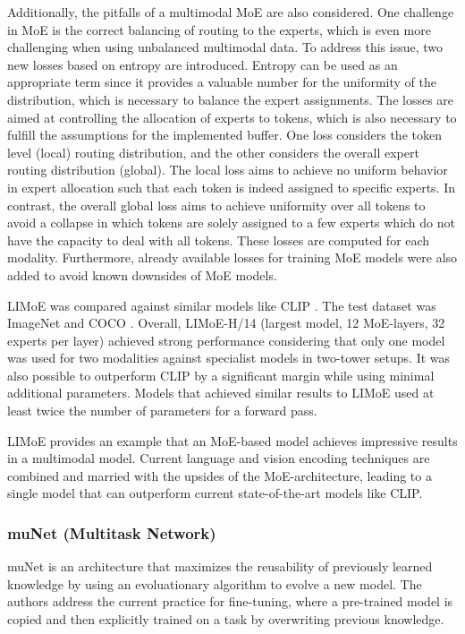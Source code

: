 \documentclass[
]{krantz}
\begin{document}
Additionally, the pitfalls of a multimodal MoE are also considered. One challenge in MoE is the correct balancing of
routing to the experts, which is even more challenging when using unbalanced multimodal data. To address this issue, two new losses based on entropy are introduced. Entropy can be used as an appropriate
term since it provides a valuable number for the uniformity of the distribution, which is necessary to balance the expert assignments. The losses are aimed at controlling the allocation of experts
to tokens, which is also necessary to fulfill the assumptions for the implemented buffer. One loss considers the token level (local) routing distribution, and the other considers the overall
expert routing distribution (global). The local loss aims to achieve no uniform behavior in expert allocation such that each token is indeed assigned to specific experts. In contrast, the overall
global loss aims to achieve uniformity over all tokens to avoid a collapse in which tokens are solely assigned to a few experts which do not have the capacity to deal with all tokens. These losses
are computed for each modality. Furthermore, already available losses for training MoE models were also added to avoid known downsides of MoE models.

LIMoE was compared against similar models like CLIP \citep{radford2021learning}.
The test dataset was ImageNet \citep{deng2009imagenet} and COCO \citep{mccoco}. Overall, LIMoE-H/14 (largest model, 12 MoE-layers, 32 experts per layer) achieved strong performance considering that only
one model was used for two modalities against specialist models in two-tower setups. It was also possible to outperform CLIP by a significant margin while using minimal additional parameters.
Models that achieved similar results to LIMoE used at least twice the number of parameters for a forward pass.

LIMoE provides an example that an MoE-based model achieves impressive results in a multimodal model. Current language and vision encoding techniques are combined and married with the upsides of
the MoE-architecture, leading to a single model that can outperform current state-of-the-art models like CLIP.

\hypertarget{munet-multitask-network}{%
\subsubsection{muNet (Multitask Network)}\label{munet-multitask-network}}

muNet \citep{Gesmundo2022a} is an architecture that maximizes the reusability of previously learned knowledge by using an evoluationary algorithm to evolve a new model.
The authors address the current practice for fine-tuning, where a pre-trained model is copied and then explicitly trained on a task by overwriting previous knowledge.
\end{document}
